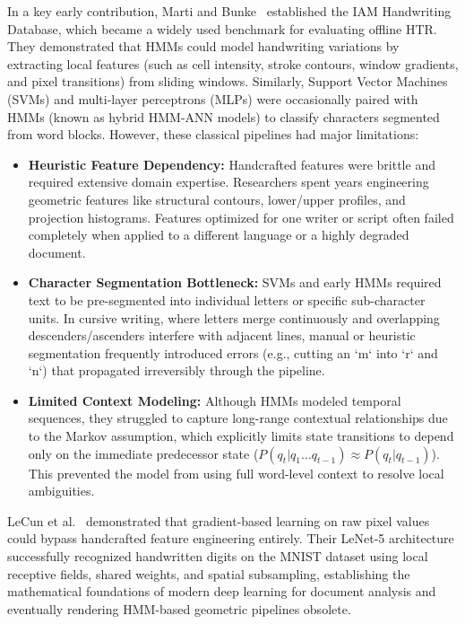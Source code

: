In a key early contribution, Marti and Bunke~\cite{marti2002iam} established the IAM Handwriting Database, which became a widely used benchmark for evaluating offline HTR. They demonstrated that HMMs could model handwriting variations by extracting local features (such as cell intensity, stroke contours, window gradients, and pixel transitions) from sliding windows. Similarly, Support Vector Machines (SVMs) and multi-layer perceptrons (MLPs) were occasionally paired with HMMs (known as hybrid HMM-ANN models) to classify characters segmented from word blocks. However, these classical pipelines had major limitations:
\begin{itemize}
    \item \textbf{Heuristic Feature Dependency:} Handcrafted features were brittle and required extensive domain expertise. Researchers spent years engineering geometric features like structural contours, lower/upper profiles, and projection histograms. Features optimized for one writer or script often failed completely when applied to a different language or a highly degraded document.
    \item \textbf{Character Segmentation Bottleneck:} SVMs and early HMMs required text to be pre-segmented into individual letters or specific sub-character units. In cursive writing, where letters merge continuously and overlapping descenders/ascenders interfere with adjacent lines, manual or heuristic segmentation frequently introduced errors (e.g., cutting an `m` into `r` and `n`) that propagated irreversibly through the pipeline.
    \item \textbf{Limited Context Modeling:} Although HMMs modeled temporal sequences, they struggled to capture long-range contextual relationships due to the Markov assumption, which explicitly limits state transitions to depend only on the immediate predecessor state ($P(q_t | q_1 \dots q_{t-1}) \approx P(q_t | q_{t-1})$). This prevented the model from using full word-level context to resolve local ambiguities.
\end{itemize}

LeCun et al.~\cite{lecun1998gradient} demonstrated that gradient-based learning on raw pixel values could bypass handcrafted feature engineering entirely. Their LeNet-5 architecture successfully recognized handwritten digits on the MNIST dataset using local receptive fields, shared weights, and spatial subsampling, establishing the mathematical foundations of modern deep learning for document analysis and eventually rendering HMM-based geometric pipelines obsolete.


